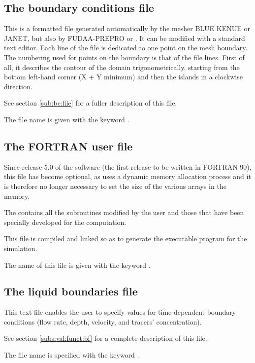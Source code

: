 \subsection{The boundary conditions file}

This is a formatted file generated automatically by the mesher BLUE KENUE
or JANET, but also by FUDAA-PREPRO or \stbtel.
It can be modified with a standard text editor.
Each line of the file is dedicated to one point on the mesh boundary.
The numbering used for points on the boundary is that of the file lines.
First of all, it describes the contour of the domain trigonometrically,
starting from the bottom left-hand corner (X + Y minimum) and then the islands
in a clockwise direction.

See section \ref{sub:bc:file} for a fuller description of this file.

The file name is given with the keyword .


\subsection{The FORTRAN user file}
\label{subs:FORT:user:file}
Since release 5.0 of the software (the first release to be written in
FORTRAN 90), this file has become optional, as  uses
a dynamic memory allocation process and it is therefore no longer necessary
to set the size of the various arrays in the memory.

The  contains all the  subroutines modified
by the user and those that have been specially developed for the computation.

This file is compiled and linked so as to generate the executable program
for the simulation.

The name of this file is given with the keyword .


\subsection{The liquid boundaries file}

This text file enables the user to specify values for time-dependent boundary
conditions (flow rate, depth, velocity, and tracers' concentration).

See section \ref{subs:val:funct:bf} for a complete description of this file.

The file name is specified with the keyword .


